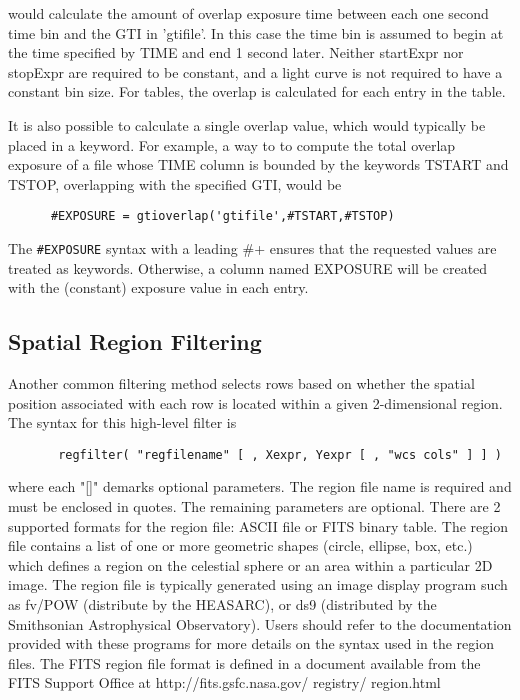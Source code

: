 \documentclass[11pt]{book}
\begin{document}
    would calculate the amount of overlap exposure time between each
    one second time bin and the GTI in 'gtifile'.  In this case the
    time bin is assumed to begin at the time specified by TIME and end
    1 second later.  Neither startExpr nor stopExpr are required to be
    constant, and a light curve is not required to have a constant bin
    size.  For tables, the overlap is calculated for each entry in the
    table.

    It is also possible to calculate a single overlap value, which
    would typically be placed in a keyword.  For example, a way to to
    compute the total overlap exposure of a file whose TIME column is
    bounded by the keywords TSTART and TSTOP, overlapping with the
    specified GTI, would be

\begin{verbatim}
      #EXPOSURE = gtioverlap('gtifile',#TSTART,#TSTOP)
\end{verbatim}

    The \verb+#EXPOSURE+ syntax with a leading \+#+ ensures that the 
    requested values are treated as keywords.  Otherwise, a column
    named EXPOSURE will be created with the (constant) exposure value
    in each entry.  


\subsection{Spatial Region Filtering}

    Another common  filtering method selects rows based on whether the
    spatial position associated with each row is located within a given
    2-dimensional region.  The syntax for this high-level filter is

\begin{verbatim}
       regfilter( "regfilename" [ , Xexpr, Yexpr [ , "wcs cols" ] ] )
\end{verbatim}
    where each "[]" demarks optional parameters. The region file name
    is required and must be  enclosed in quotes.  The remaining
    parameters are optional.  There are 2 supported formats for the
    region file: ASCII file or FITS binary table.  The region file
    contains a list of one or more geometric shapes (circle,
    ellipse, box, etc.) which defines a region on the celestial sphere
    or an area within a particular 2D image.  The region file is
    typically generated using an image display program such as fv/POW
    (distribute by the HEASARC), or ds9 (distributed by the Smithsonian
    Astrophysical Observatory).  Users should refer to the documentation
    provided with these programs for more details on the syntax used in
    the region files.  The FITS region file format is defined in a document
    available from the FITS Support Office at
    http://fits.gsfc.nasa.gov/ registry/ region.html
\end{document}
